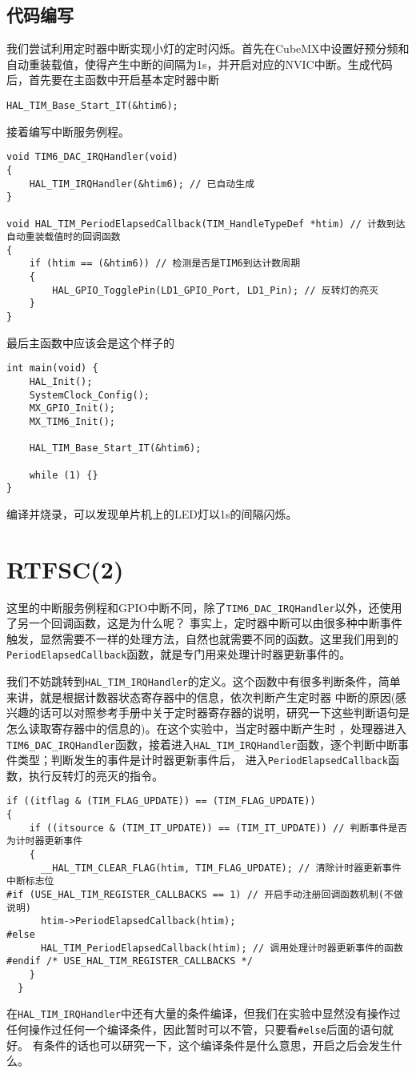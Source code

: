 \subsection{代码编写}
我们尝试利用定时器中断实现小灯的定时闪烁。首先在CubeMX中设置好预分频和自动重装载值，使得产生中断的间隔为1s，并开启对应的NVIC中断。生成代码后，首先要在主函数中开启基本定时器中断
\begin{lstlisting}
HAL_TIM_Base_Start_IT(&htim6);
\end{lstlisting}
接着编写中断服务例程。
\begin{lstlisting}
void TIM6_DAC_IRQHandler(void)
{
    HAL_TIM_IRQHandler(&htim6); // 已自动生成
}

void HAL_TIM_PeriodElapsedCallback(TIM_HandleTypeDef *htim) // 计数到达自动重装载值时的回调函数
{
    if (htim == (&htim6)) // 检测是否是TIM6到达计数周期
    {
        HAL_GPIO_TogglePin(LD1_GPIO_Port, LD1_Pin); // 反转灯的亮灭
    }
}
\end{lstlisting}
最后主函数中应该会是这个样子的
\begin{lstlisting}
int main(void) {
    HAL_Init();
    SystemClock_Config();
    MX_GPIO_Init();
    MX_TIM6_Init();

    HAL_TIM_Base_Start_IT(&htim6);

    while (1) {}
}
\end{lstlisting}
编译并烧录，可以发现单片机上的LED灯以1s的间隔闪烁。
\section{RTFSC(2)}
这里的中断服务例程和GPIO中断不同，除了\verb|TIM6_DAC_IRQHandler|以外，还使用了另一个回调函数，这是为什么呢？
事实上，定时器中断可以由很多种中断事件触发，显然需要不一样的处理方法，自然也就需要不同的函数。这里我们用到的
\verb|PeriodElapsedCallback|函数，就是专门用来处理计时器更新事件的。

我们不妨跳转到\verb|HAL_TIM_IRQHandler|的定义。这个函数中有很多判断条件，简单来讲，就是根据计数器状态寄存器中的信息，依次判断产生定时器
中断的原因(感兴趣的话可以对照参考手册中关于定时器寄存器的说明，研究一下这些判断语句是怎么读取寄存器中的信息的)。在这个实验中，当定时器中断产生时
，处理器进入\verb|TIM6_DAC_IRQHandler|函数，接着进入\verb|HAL_TIM_IRQHandler|函数，逐个判断中断事件类型；判断发生的事件是计时器更新事件后，
进入\verb|PeriodElapsedCallback|函数，执行反转灯的亮灭的指令。
\begin{lstlisting}
if ((itflag & (TIM_FLAG_UPDATE)) == (TIM_FLAG_UPDATE))
{
    if ((itsource & (TIM_IT_UPDATE)) == (TIM_IT_UPDATE)) // 判断事件是否为计时器更新事件
    {
      __HAL_TIM_CLEAR_FLAG(htim, TIM_FLAG_UPDATE); // 清除计时器更新事件中断标志位
#if (USE_HAL_TIM_REGISTER_CALLBACKS == 1) // 开启手动注册回调函数机制(不做说明)
      htim->PeriodElapsedCallback(htim); 
#else
      HAL_TIM_PeriodElapsedCallback(htim); // 调用处理计时器更新事件的函数
#endif /* USE_HAL_TIM_REGISTER_CALLBACKS */
    }
  }
\end{lstlisting}
在\verb|HAL_TIM_IRQHandler|中还有大量的条件编译，但我们在实验中显然没有操作过任何操作过任何一个编译条件，因此暂时可以不管，只要看\verb|#else|后面的语句就好。
有条件的话也可以研究一下，这个编译条件是什么意思，开启之后会发生什么。

